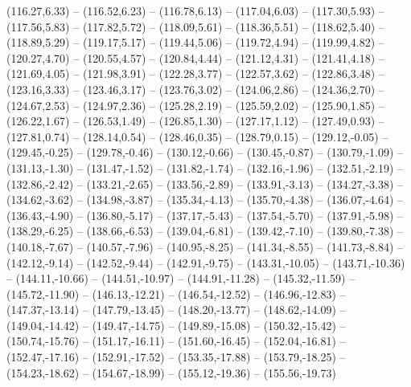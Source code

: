 {  (116.27,6.33) -- (116.52,6.23) -- (116.78,6.13) -- (117.04,6.03) -- (117.30,5.93) -- (117.56,5.83) -- (117.82,5.72) --
  (118.09,5.61) -- (118.36,5.51) -- (118.62,5.40) -- (118.89,5.29) -- (119.17,5.17) -- (119.44,5.06) -- (119.72,4.94) --
  (119.99,4.82) -- (120.27,4.70) -- (120.55,4.57) -- (120.84,4.44) -- (121.12,4.31) -- (121.41,4.18) -- (121.69,4.05) --
  (121.98,3.91) -- (122.28,3.77) -- (122.57,3.62) -- (122.86,3.48) -- (123.16,3.33) -- (123.46,3.17) -- (123.76,3.02) --
  (124.06,2.86) -- (124.36,2.70) -- (124.67,2.53) -- (124.97,2.36) -- (125.28,2.19) -- (125.59,2.02) -- (125.90,1.85) --
  (126.22,1.67) -- (126.53,1.49) -- (126.85,1.30) -- (127.17,1.12) -- (127.49,0.93) -- (127.81,0.74) -- (128.14,0.54) --
  (128.46,0.35) -- (128.79,0.15) -- (129.12,-0.05) -- (129.45,-0.25) -- (129.78,-0.46) -- (130.12,-0.66) -- (130.45,-0.87) --
  (130.79,-1.09) -- (131.13,-1.30) -- (131.47,-1.52) -- (131.82,-1.74) -- (132.16,-1.96) -- (132.51,-2.19) -- (132.86,-2.42) --
  (133.21,-2.65) -- (133.56,-2.89) -- (133.91,-3.13) -- (134.27,-3.38) -- (134.62,-3.62) -- (134.98,-3.87) -- (135.34,-4.13) --
  (135.70,-4.38) -- (136.07,-4.64) -- (136.43,-4.90) -- (136.80,-5.17) -- (137.17,-5.43) -- (137.54,-5.70) -- (137.91,-5.98) --
  (138.29,-6.25) -- (138.66,-6.53) -- (139.04,-6.81) -- (139.42,-7.10) -- (139.80,-7.38) -- (140.18,-7.67) -- (140.57,-7.96) --
  (140.95,-8.25) -- (141.34,-8.55) -- (141.73,-8.84) -- (142.12,-9.14) -- (142.52,-9.44) -- (142.91,-9.75) -- (143.31,-10.05) --
  (143.71,-10.36) -- (144.11,-10.66) -- (144.51,-10.97) -- (144.91,-11.28) -- (145.32,-11.59) -- (145.72,-11.90) -- (146.13,-12.21) --
  (146.54,-12.52) -- (146.96,-12.83) -- (147.37,-13.14) -- (147.79,-13.45) -- (148.20,-13.77) -- (148.62,-14.09) -- (149.04,-14.42) --
  (149.47,-14.75) -- (149.89,-15.08) -- (150.32,-15.42) -- (150.74,-15.76) -- (151.17,-16.11) -- (151.60,-16.45) -- (152.04,-16.81) --
  (152.47,-17.16) -- (152.91,-17.52) -- (153.35,-17.88) -- (153.79,-18.25) -- (154.23,-18.62) -- (154.67,-18.99) -- (155.12,-19.36) --
  (155.56,-19.73)}
